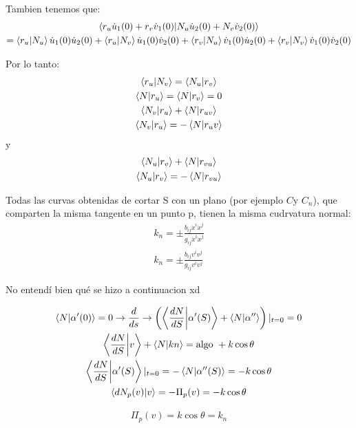 \documentclass{article}
\newcommand{\caja}[3]{%
  \begin{tcolorbox}[colback=#1!5!white,colframe=#1!25!black,title=#2]
    #3
  \end{tcolorbox}%
}
\begin{document}
Tambien tenemos que: 
\begin{gather}
  \bra{r_u \dot u _1 (0) + r_v \dot v_1 (0)}\ket{N_u \dot u _2(0) + N_v \dot v_2 (0)}\\
  = \bra{r_u }\ket{N_u }\dot u _1 (0) \dot u _2 (0) + \bra{r_u }\ket{N_v }\dot u_1 (0)\dot v_2 (0) + \bra{r_v }\ket{N_u }\dot v_1 (0)\dot u_2 (0) + \bra{r_v }\ket{N_v }\dot v_1(0) \dot v_2(0)    
\end{gather}

Por lo tanto: 
\begin{gather}
  \bra{r_u }\ket{N_v } = \bra{N_u }\ket{r_v }\\
  \bra{N}\ket{r_u } = \bra{N}\ket{r_v } = 0 \\
  \bra{N_v }\ket{r_u }+ \bra{N}\ket{r _{uv } }\\  
  \bra{N_v }\ket{r_u } = - \bra{N }\ket{r_uv }  
\end{gather}
y 
\begin{gather}
  \bra{N_u }\ket{r_v }+ \bra{N }\ket{r _{vu } }\\
  \bra{N_u }\ket{r_v } = - \bra{N }\ket{r _{vu } }  
\end{gather}

\caja{green}{Teorema de meusnier }{
  Todas las curvas obtenidas de cortar S con un plano (por ejemplo $ C  $y $ C_n  $), que comparten la misma tangente en un punto p, tienen la misma cudrvatura normal: 
  \begin{gather}
    k_n = \pm \frac{b _{ij }\dot x ^ {i }\dot x ^ {j }}{g _{ij }\dot x ^ {i }\dot x ^ {j }} \\
    k_n = \pm \frac{b _{ij }v ^ {i }v ^ {j }}{g _{ij }v ^ {i }v ^ {j }} 
    \label{eq:teo_meusnier}
  \end{gather}
}

No entendí bien qué se hizo a continuacion xd

\begin{gather}
  \bra{N }\ket{\alpha'(0)} = 0 \rightarrow \frac{d  }{d s} \rightarrow \left(\bra{\frac{d N }{d S }} \ket{\alpha'(S)} + \bra{N }\ket{\alpha''}  \right)|_{t = 0 }  = 0 \\
  \bra{\frac{d N }{d S}}\ket{v } + \bra{N }\ket{kn } = \text{algo }+ k \cos{\theta}\\
  \bra{\frac{d N  }{d S }}\ket{\alpha'(S) }| _{t = 0 } = - \bra{N }\ket{\alpha''(S)} = -k \cos{\theta}\\
  \bra{dN_p(v)}\ket{v} = - \Pi _p (v) = -k \cos{\theta}
\end{gather}
\caja{red}{}{
  \begin{gather}
    \Pi _p (v) = k \cos{\theta} = k_n  
  \end{gather}
}
\end{document}
